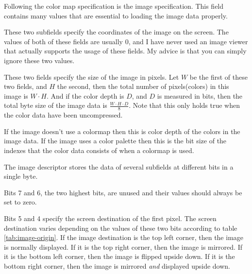 
Following the color map specification is the image specification. This
field contains many values that are essential to loading the image data
properly.



These two subfields specify the coordinates of the image on the
screen. The values of both of these fields are usually $0$, and I have
never used an image viewer that actually supports the usage of these
fields. My advice is that you can simply ignore these two values.



These two fields specify the size of the image in pixels. Let $W$ be
the first of these two fields, and $H$ the second, then the total
number of pixels(colors) in this image is $W \cdot H$. And if the
color depth is $D$, and $D$ is measured in bits, then the total byte
size of the image data is $\frac{W \cdot H \cdot D}{8}$. Note that
this only holds true when the color data have been uncompressed.


If the image doesn't use a colormap then this is color depth of the
colors in the image data. If the image uses a color palette then this
is the bit size of the indexes that the color data consists of when a
colormap is used.


The image descriptor stores the data of several subfields at different
bits in a single byte.

Bits 7 and 6, the two highest bits, are unused and their values should
always be set to zero.

Bits 5 and 4 specify the screen destination of the first pixel. The
screen destination varies depending on the values of these two bits
according to table \ref{tab:image-origin}. If the image destination is
the top left corner, then the image is normally displayed. If it is
the top right corner, then the image is mirrored. If it is the bottom
left corner, then the image is flipped upside down. If it is the
bottom right corner, then the image is mirrored \textit{and} displayed
upside down.


